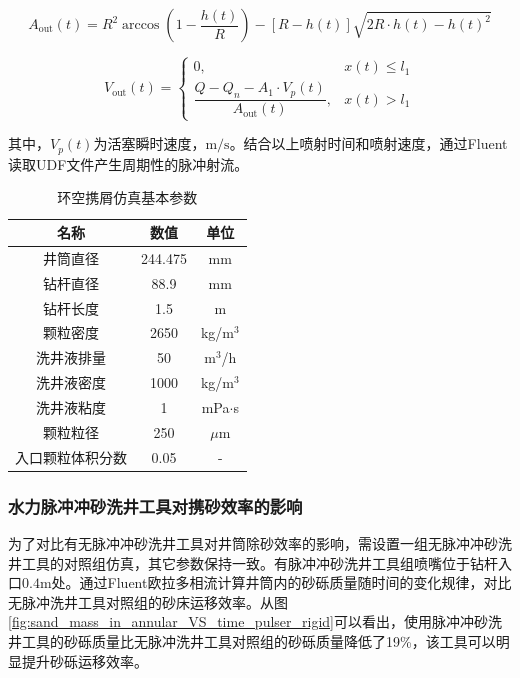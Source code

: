 \begin{equation}
	A_{\mathrm{out}}(t)=R^{2}\arccos\left(1-\frac{h(t)}{R}\right)-\left[R-h(t)\right]\sqrt{2R\cdot h(t)-h(t)^{2}}
	\label{eq:open_area_segment}
\end{equation}

\begin{equation}
	V_{\mathrm{out}}(t)=
	\begin{cases}
		0, & x(t)\le l_1 \\[4pt]
		\dfrac{Q-Q_n-A_1\cdot V_p(t)}{A_{\mathrm{out}}(t)}, & x(t)>l_1
	\end{cases}
	\label{eq:vout_coupling}
\end{equation}

其中，$V_p(t)$为活塞瞬时速度，$\mathrm{m/s}$。结合以上喷射时间和喷射速度，通过Fluent读取UDF文件产生周期性的脉冲射流。
\begin{table}[htbp]
    \centering
    \caption{环空携屑仿真基本参数}
    \label{tab:annulus_sand_simulation_params}
    \renewcommand{\arraystretch}{1.5} %
    \begin{tabularx}{.9\textwidth}{CCC}
        \toprule %
        名称 & 数值 & 单位 \\
        \midrule %
        井筒直径 & 244.475 & mm \\
        钻杆直径 & 88.9 & mm \\
        钻杆长度 & 1.5 & m \\
        颗粒密度 & 2650 & kg/m$^3$ \\
        洗井液排量 & 50 & m$^3$/h \\
        洗井液密度 & 1000 & kg/m$^3$ \\
        洗井液粘度 & 1 & mPa$\cdot$s \\
        颗粒粒径 & 250 & $\mu$m \\
        入口颗粒体积分数 & 0.05 & - \\
        \bottomrule %
    \end{tabularx}
\end{table}

\subsubsection{水力脉冲冲砂洗井工具对携砂效率的影响}
为了对比有无脉冲冲砂洗井工具对井筒除砂效率的影响，需设置一组无脉冲冲砂洗井工具的对照组仿真，其它参数保持一致。有脉冲冲砂洗井工具组喷嘴位于钻杆入口$0.4\mathrm{m}$处。通过Fluent欧拉多相流计算井筒内的砂砾质量随时间的变化规律，对比无脉冲洗井工具对照组的砂床运移效率。从图\ref{fig:sand_mass_in_annular_VS_time_pulser_rigid}可以看出，使用脉冲冲砂洗井工具的砂砾质量比无脉冲洗井工具对照组的砂砾质量降低了19\%，该工具可以明显提升砂砾运移效率\cite{ref30,ref31}。

